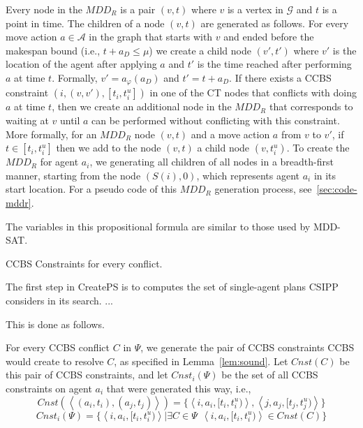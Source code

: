 \documentclass[review]{elsarticle}
\newcommand{\tuple}[1]{\ensuremath{\left \langle #1 \right \rangle }}
\newcommand{\mddr}{\ensuremath{MDD_R}\xspace}
\newcommand{\source}{\ensuremath{S}\xspace}
\newcommand{\ccbs}{\ac{CCBS}\xspace}
\newcommand{\ct}{\ac{CT}\xspace}
\newcommand{\csipp}{\ac{CSIPP}\xspace}
\begin{document}
Every node in the \mddr is a pair $(v,t)$ where $v$ is a vertex in $\mathcal{G}$ and $t$ is a point in time. 
The children of a node $(v,t)$ are generated as follows. 
For every move action $a\in \mathcal{A}$ in the graph 
that starts with $v$ and ended before the makespan bound (i.e., $t+a_D\leq \mu$)
we create a child node $(v',t')$ where 
$v'$ is the location of the agent after applying $a$ and 
$t'$ is the time reached after performing $a$ at time $t$. 
Formally, $v'=a_\varphi(a_D)$ and $t'=t+a_D$. 
If there exists a \ccbs constraint $(i, (v,v'), [t_i, t_i^u])$ in one of the \ct nodes 
that conflicts with doing $a$ at time $t$, 
then we create an additional node in the \mddr that corresponds to waiting at $v$ until $a$ can be performed without conflicting with this constraint. 
More formally, for an \mddr node $(v,t)$ 
and a move action $a$ from $v$ to $v'$, 
if $t\in [t_i, t_i^u]$ then we add to the node $(v,t)$ a child node $(v,t_i^u)$. 
To create the \mddr for agent $a_i$, we generating all children of all nodes in a breadth-first manner, starting from the node $(\source(i),0)$, which represents agent $a_i$ in its start location. For a pseudo code of this \mddr generation process, see~\ref{sec:code-mddr}. 









The variables in this propositional formula are similar to those used by MDD-SAT. 

\ccbs Constraints for every conflict.

The first step in CreatePS is to computes the set of single-agent plans \csipp considers in its search. 
...


This is done as follows. 






For every \ccbs conflict $C$ in $\Psi$, we generate the pair of \ccbs constraints \ccbs would create to resolve $C$, as specified in Lemma~\ref{lem:sound}. 
Let $Cnst(C)$ be this pair of \ccbs constraints, 
and let $Cnst_i(\Psi)$ be the set of all \ccbs constraints on agent $a_i$ that were generated this way, i.e., 
\begin{equation}
Cnst(\tuple{ (a_i, t_i), (a_j,t_j) }) = \{ \tuple{i, a_i, [t_i, t_i^u)}, \tuple{j, a_j, [t_j, t_j^u)} \}
\end{equation}
\begin{equation}
Cnst_i(\Psi) = \{ \tuple{i, a_i, [t_i, t_i^u)} | 
\exists C\in \Psi ~~ \tuple{i, a_i, [t_i, t_i^u)}\in Cnst(C) \}
\end{equation}
\end{document}
